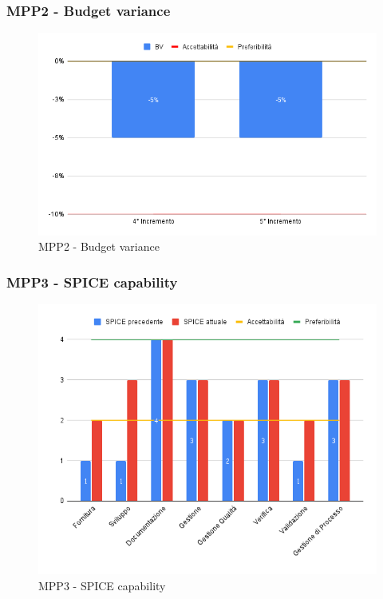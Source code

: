 \subsubsection{MPP2 - Budget variance}

\begin{figure}[H]
	\centering
	\includegraphics[scale = 0.6]{sezioni/Images/PB/BV.png}
	\caption{MPP2 - Budget variance}
\end{figure}

\subsubsection{MPP3 - SPICE capability}

\begin{figure}[H]
	\centering
	\includegraphics[scale = 0.6]{sezioni/Images/PB/SPICE.png}
	\caption{MPP3 - SPICE capability}
\end{figure}

